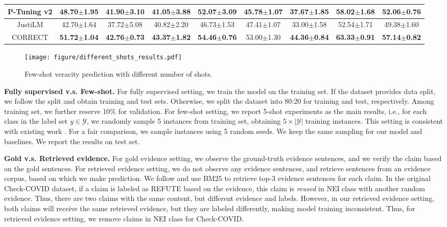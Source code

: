 \begin{table*}[t]
{\begin{tabular}{c|cc|cc|cc|cc}
                \hline
                P-Tuning v2 & 48.70$ \pm $1.95 & 41.90$ \pm $3.10 & 41.05$ \pm $3.88 & 52.07$ \pm $3.09 & 45.78$ \pm $1.07 & 37.67$ \pm $1.85 & 58.02$ \pm $1.68 & 52.06$ \pm $0.76 \\
                \hline
                JustiLM & 42.70$ \pm $1.64 & 37.72$ \pm $5.08 & 40.82$ \pm $2.20 & 46.73$ \pm $1.53 & 47.41$ \pm $1.07 & 33.00$ \pm $1.58 & 52.54$ \pm $1.71 & 49.38$ \pm $1.60 \\
                \hline
                CORRECT & \textbf{51.72}$ \pm $\textbf{1.04} & \textbf{42.76}$ \pm $\textbf{0.73} & \textbf{43.37}$ \pm $\textbf{1.82} & \textbf{54.46}$ \pm $\textbf{0.76} & 53.00$ \pm $1.30 & \textbf{44.36}$ \pm $\textbf{0.84} & \textbf{63.33}$ \pm $\textbf{0.91} & \textbf{57.14}$ \pm $\textbf{0.82} \\
			\bottomrule
		\end{tabular}
	}
	\label{table:5_shot_micro_f1}
\end{table*}
\begin{figure*}[h]
	\centering
	\texttt{[image: figure/different\_shots\_results.pdf]}
	\caption{Few-shot veracity prediction with different number of shots.}
	\label{fig:different_shots_results}
\end{figure*}

\textbf{Fully supervised v.s. Few-shot.} For fully supervised setting, we train the model on the training set. If the dataset provides data split, we follow the split and obtain training and test sets. Otherwise, we split the dataset into 80:20 for training and test, respectively. Among training set, we further reserve 10\% for validation. For few-shot setting, we report 5-shot experiments as the main results, i.e., for each class in the label set $ y\in\mathcal{Y} $, we randomly sample 5 instances from training set, obtaining $ 5\times|\mathcal{Y}| $ training instances. This setting is consistent with existing work \cite{protoco}. For a fair comparison, we sample instances using 5 random seeds. We keep the same sampling for our model and baselines. We report the results on test set.

\textbf{Gold v.s. Retrieved evidence.} For gold evidence setting, we observe the ground-truth evidence sentences, and we verify the claim based on the gold sentences. For retrieved evidence setting, we do not observe any evidence sentences, and retrieve sentences from an evidence corpus, based on which we make prediction. We follow \cite{programfc} and use BM25 \cite{bm25} to retrieve top-3 evidence sentences for each claim. In the original Check-COVID dataset, if a claim is labeled as REFUTE based on the evidence, this claim is \emph{reused} in NEI class with another random evidence. Thus, there are two claims with the same content, but different evidence and labels. However, in our retrieved evidence setting, both claims will receive the same retrieved evidence, but they are labeled differently, making model training inconsistent. Thus, for retrieved evidence setting, we remove claims in NEI class for Check-COVID.

